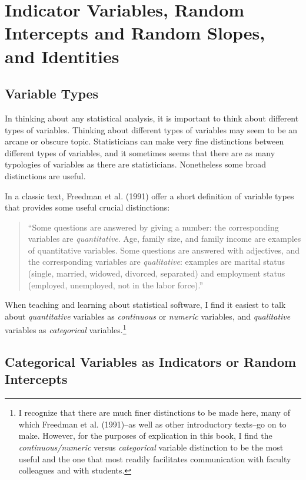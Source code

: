 \documentclass[
  letterpaper,
  DIV=11,
  numbers=noendperiod]{scrreprt}
\begin{document}
\section{Indicator Variables, Random Intercepts and Random Slopes, and
Identities}\label{sec-indicator-variables-random-effects}

\subsection{Variable Types}\label{variable-types}

In thinking about any statistical analysis, it is important to think
about different types of variables. Thinking about different types of
variables may seem to be an arcane or obscure topic. Statisticians can
make very fine distinctions between different types of variables, and it
sometimes seems that there are as many typologies of variables as there
are statisticians. Nonetheless some broad distinctions are useful.

In a classic text, Freedman et al. (1991) offer a short definition of
variable types that provides some useful crucial distinctions:

\begin{quote}
``Some questions are answered by giving a number: the corresponding
variables are \emph{quantitative}. Age, family size, and family income
are examples of quantitative variables. Some questions are answered with
adjectives, and the corresponding variables are \emph{qualitative}:
examples are marital status (single, married, widowed, divorced,
separated) and employment status (employed, unemployed, not in the labor
force).''
\end{quote}

When teaching and learning about statistical software, I find it easiest
to talk about \emph{quantitative} variables as \emph{continuous} or
\emph{numeric} variables, and \emph{qualitative} variables as
\emph{categorical} variables.\footnote{I recognize that there are much
  finer distinctions to be made here, many of which Freedman et al.
  (1991)--as well as other introductory texts--go on to make. However,
  for the purposes of explication in this book, I find the
  \emph{continuous/numeric} versus \emph{categorical} variable
  distinction to be the most useful and the one that most readily
  facilitates communication with faculty colleagues and with students.}

\subsection{Categorical Variables as Indicators or Random
Intercepts}\label{categorical-variables-as-indicators-or-random-intercepts}
\end{document}
